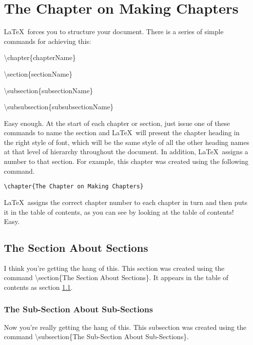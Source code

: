\chapter{The Chapter on Making Chapters}
\label{sec:Chapters}

\LaTeX\ forces you to structure your document. There is a series of simple commands for achieving this:

\vspace*{2ex}

{\textbackslash}chapter\{chapterName\}

{\textbackslash}section\{sectionName\}

{\textbackslash}subsection\{subsectionName\}

{\textbackslash}subsubsection\{subsubsectionName\}

\vspace*{2ex}

Easy enough. At the start of each chapter or section, just issue one of these commands to name the section and \LaTeX\ will present the chapter heading in the right style of font, which will be the same style of all the other heading names at that level of hierarchy throughout the document. In addition, \LaTeX\ assigns a number to that section. For example, this chapter was created using the following command.
\begin{verbatim}
\chapter{The Chapter on Making Chapters}
\end{verbatim}

\LaTeX\ assigns the correct chapter number to each chapter in turn and then puts it in the table of contents, as you can see by looking at the table of contents! Easy.

\pagebreak
\section{The Section About Sections}
\label{sec:Section}
I think you're getting the hang of this. This section was created using the command {\textbackslash}section\{The Section About Sections\}. It appears in the table of contents as section \ref{sec:Section}.

\subsection{The Sub-Section About Sub-Sections}
\label{sec:SubSection}
Now you're really getting the hang of this. This subsection was created using the command {\textbackslash}subsection\{The Sub-Section About Sub-Sections\}. 

